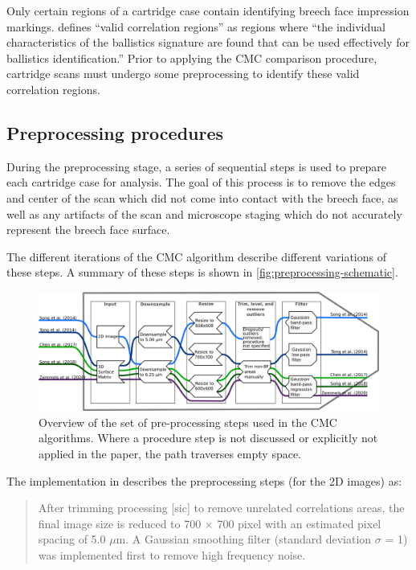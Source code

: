Only certain regions of a cartridge case contain identifying breech face
impression markings. \citet{song_proposed_2013} defines ``valid
correlation regions'' as regions where ``the individual characteristics
of the ballistics signature are found that can be used effectively for
ballistics identification.'' Prior to applying the CMC comparison
procedure, cartridge scans must undergo some preprocessing to identify
these valid correlation regions.

\hypertarget{preProcessing}{%
\subsection{Preprocessing procedures}\label{preProcessing}}

During the preprocessing stage, a series of sequential steps is used to
prepare each cartridge case for analysis. The goal of this process is to
remove the edges and center of the scan which did not come into contact
with the breech face, as well as any artifacts of the scan and
microscope staging which do not accurately represent the breech face
surface.

The different iterations of the CMC algorithm describe different
variations of these steps. A summary of these steps is shown in
\autoref{fig:preprocessing-schematic}.

\begin{figure}
\includegraphics[width=\linewidth]{images/preprocessing_flow.png}
\caption{Overview of the set of pre-processing steps used in the CMC algorithms. Where a procedure step is not discussed or explicitly not applied in the paper, the path traverses empty space.}\label{fig:preprocessing-schematic}
\end{figure}

The implementation in \citet{tong_fired_2014} describes the
preprocessing steps (for the 2D images) as:

\begin{quote}
After trimming processing {[}sic{]} to remove unrelated correlations
areas, the final image size is reduced to 700 × 700 pixel with an
estimated pixel spacing of 5.0 \(\mu\)m. A Gaussian smoothing filter
(standard deviation \(\sigma\) = 1) was implemented first to remove high
frequency noise.
\end{quote}

